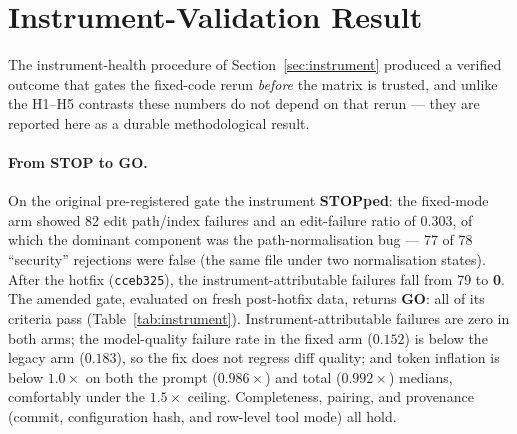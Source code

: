 

\section{Instrument-Validation Result}
\label{sec:instrument-results}

The instrument-health procedure of Section~\ref{sec:instrument} produced a verified outcome
that gates the fixed-code rerun \emph{before} the matrix is trusted, and unlike the H1--H5
contrasts these numbers do not depend on that rerun --- they are reported here as a durable
methodological result.

\paragraph{From STOP to GO.}
On the original pre-registered gate the instrument \textbf{STOPped}: the fixed-mode arm
showed 82 edit path/index failures and an edit-failure ratio of $0.303$, of which the
dominant component was the path-normalisation bug --- 77 of 78 ``security'' rejections were
false (the same file under two normalisation states). After the hotfix (\texttt{cceb325}),
the instrument-attributable failures fall from 79 to \textbf{0}. The amended gate, evaluated
on fresh post-hotfix data, returns \textbf{GO}: all of its criteria pass
(Table~\ref{tab:instrument}). Instrument-attributable failures are zero in both arms; the
model-quality failure rate in the fixed arm ($0.152$) is below the legacy arm ($0.183$), so
the fix does not regress diff quality; and token inflation is below $1.0\times$ on both the
prompt ($0.986\times$) and total ($0.992\times$) medians, comfortably under the $1.5\times$
ceiling. Completeness, pairing, and provenance (commit, configuration hash, and row-level
tool mode) all hold.

